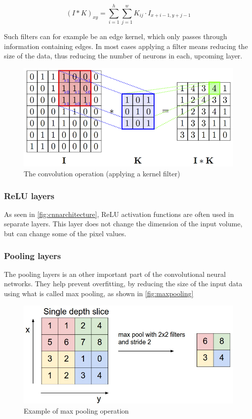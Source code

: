 \begin{equation}\label{eq:convop}
(I*K)_{xy} = \sum_{i=1}^{h}\sum_{j=1}^{w}K_{ij} \cdot I_{x+i-1,y+j-1}
\end{equation}

Such filters can for example be an edge kernel, which only passes through information containing edges. In most cases applying a filter means reducing the size of the data, thus reducing the number of neurons in each, upcoming layer.

\begin{figure}[!h]
	\centering
	\includegraphics[scale=1.5]{fig/kernel_filter.png}
	\caption{The convolution operation (applying a kernel filter) \cite{Cambridge2017}}
	\label{fig:cnnarchitecture}
\end{figure}

\subsubsection{ReLU layers}
As seen in \autoref{fig:cnnarchitecture}, ReLU activation functions are often used in separate layers. This layer does not change the dimension of the input volume, but can change some of the pixel values.

\subsubsection{Pooling layers}\label{section:pooling}
The pooling layers is an other important part of the convolutional neural networks. They help prevent overfitting, by reducing the size of the input data using what is called max pooling, as shown in \autoref{fig:maxpooling}
\begin{figure}[!h]
	\centering
	\includegraphics[scale=0.5]{fig/pooling_layer.jpeg}
	\caption{Example of max pooling operation \cite{Karpathy2017}}
	\label{fig:maxpooling}
\end{figure}

